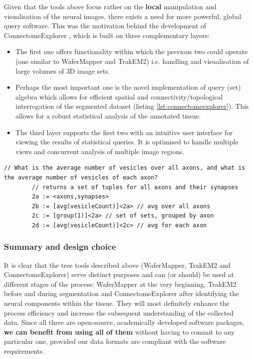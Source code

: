 \documentclass[a4paper, 11pt]{article}
\numberwithin{equation}{section}
\begin{document}
		Given that the tools above focus rather on the \textbf{local} manipulation and visualisation of the neural images, there exists a need for more powerful, global query software. This was the motivation behind the development of ConnectomeExplorer \cite{beyer2013connectomeexplorer}, which is built on three complementary layers:
		\begin{itemize}
			\item The first one offers functionality within which the previous two could operate (one similar to WaferMapper and TrakEM2) i.e. handling and visualisation of large volumes of 3D image sets.
			
			\item Perhaps the most important one is the novel implementation of query (set) algebra which allows for efficient spatial and connectivity/topological interrogation of the segmented dataset (listing  \ref{lst:connectomeexplorer}). This allows for a robust statistical analysis of the annotated tissue.
			
			\item The third layer supports the first two with an intuitive user interface for viewing the results of statistical queries. It is optimised to handle multiple views and concurrent analysis of multiple image regions.
		\end{itemize}
		
		\begin{lstlisting}[caption={An example of a query in ConnectomeExplorer},label={lst:connectomeexplorer}]
		// What is the average number of vesicles over all axons, and what is the average number of vesicles of each axon?
		// returns a set of tuples for all axons and their synapses
		2a := <axons,synapses>
		2b := [avg(vesicleCount)]<2a> // avg over all axons
		2c := [group(1)]<2a> // set of sets, grouped by axon
		2d := [avg(vesicleCount)]<2c> // avg for each axon
		\end{lstlisting}
		
		\subsubsection{Summary and design choice}
		
		\noindent It is clear that the tree tools described above (WaferMapper, TrakEM2 and ConnectomeExplorer) serve distinct purposes and can (or should) be used at different stages of the process: WaferMapper at the very beginning, TrakEM2 before and during segmentation and ConnectomeExplorer after identifying the neural components within the tissue. They will most definitely enhance the process efficiency and increase the subsequent understanding of the collected data. Since all three are open-source, academically developed software packages, \textbf{we can benefit from using all of them} without having to commit to any particular one, provided our data formats are compliant with the software requirements.
		
\end{document}
